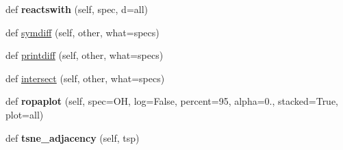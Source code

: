 \begin{DoxyCompactItemize}
def {\bfseries reactswith} (self, spec, d=\textquotesingle{}all\textquotesingle{})
\item 
def \mbox{\hyperlink{classexplore__dsmacc_1_1new_a9645f471aa02539559f99ecec3348b6f}{symdiff}} (self, other, what=\textquotesingle{}specs\textquotesingle{})
\item 
def \mbox{\hyperlink{classexplore__dsmacc_1_1new_a36b235122bd6e70ea453a0da1df3bc99}{printdiff}} (self, other, what=\textquotesingle{}specs\textquotesingle{})
\item 
def \mbox{\hyperlink{classexplore__dsmacc_1_1new_acc9266b7b7ae7a41e337bd755288a60b}{intersect}} (self, other, what=\textquotesingle{}specs\textquotesingle{})
\item 
\mbox{\label{classexplore__dsmacc_1_1new_a95e1201474c4b697559368bec1a73cbf}} 
def {\bfseries ropaplot} (self, spec=\textquotesingle{}OH\textquotesingle{}, log=False, percent=95, alpha=0., stacked=True, plot=\textquotesingle{}all\textquotesingle{})
\item 
\mbox{\label{classexplore__dsmacc_1_1new_a8f2641f03077e250f338cc828e45cdca}} 
def {\bfseries tsne\+\_\+adjacency} (self, tsp)
\end{DoxyCompactItemize}

